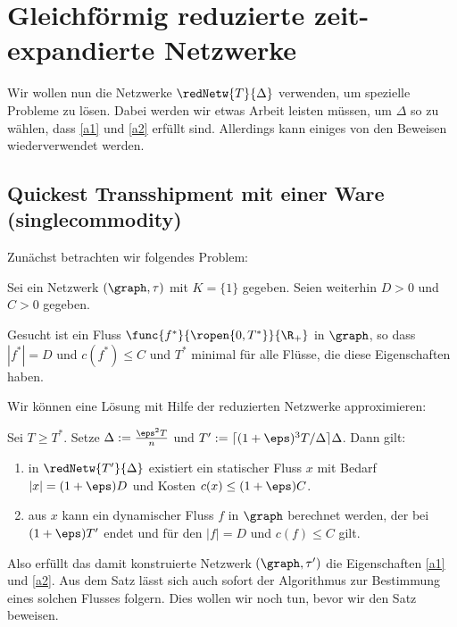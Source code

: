 \section{Gleichförmig reduzierte zeit-expandierte Netzwerke}\label{sec:unif_cond}
Wir wollen nun die Netzwerke $\redNetw{T}{\Delta}$ verwenden, um spezielle
Probleme zu lösen. Dabei werden wir etwas Arbeit leisten müssen, um
$\Delta$ so zu wählen, dass \ref{a1} und \ref{a2} erfüllt sind.
Allerdings kann einiges von den Beweisen wiederverwendet werden.

\subsection{Quickest Transshipment mit einer Ware (singlecommodity)}
Zunächst betrachten wir folgendes Problem:

\begin{problem}
\label{prob:qtp_single}
    Sei ein Netzwerk $(\graph, \tau)$ mit $K=\{1\}$ gegeben.
    Seien weiterhin $D > 0$ und $C > 0$ gegeben.
    
    Gesucht ist ein Fluss $\func{f^*}{\ropen{0,T^*}}{\R_+}$ in $\graph$,
    so dass $|f^*| = D$ und $c(f^*) \leq C$ und $T^*$ minimal für alle Flüsse,
    die diese Eigenschaften haben.
\end{problem}

Wir können eine Lösung mit Hilfe der reduzierten Netzwerke approximieren:

\begin{theorem}\label{theo:qtp_flow_ex}
    Sei $T \geq T^*$. Setze $\Delta := \frac{\eps^2 T}{n}$ und
    $T' := \lceil (1+\eps)^3 T / \Delta \rceil \Delta$.
    Dann gilt:
    \begin{enumerate}[label={\alph*)}]
        \item in $\redNetw{T'}{\Delta}$ existiert ein statischer Fluss $x$ mit
            Bedarf $|x| = (1 + \eps)D$ und Kosten $c(x) \leq (1+\eps)C$.
        \item aus $x$ kann ein dynamischer Fluss $f$ in $\graph$ berechnet werden,
            der bei $(1+\eps)T'$ endet und für den $|f| = D$ und $c(f) \leq C$
            gilt.
    \end{enumerate}
\end{theorem}

Also erfüllt das damit konstruierte Netzwerk $(\graph, \tau')$ die Eigenschaften
\ref{a1} und \ref{a2}. Aus dem Satz lässt sich auch sofort der Algorithmus
zur Bestimmung eines solchen Flusses folgern. Dies wollen wir noch tun,
bevor wir den Satz beweisen.

